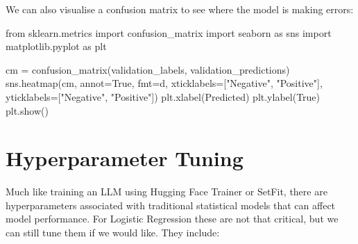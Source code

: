 \documentclass[
  letterpaper,
  DIV=11,
  numbers=noendperiod]{scrreprt}
\newenvironment{Shaded}{\begin{snugshade}}{\end{snugshade}}
\newcommand{\ImportTok}[1]{\textcolor[rgb]{0.00,0.46,0.62}{#1}}
\newcommand{\NormalTok}[1]{\textcolor[rgb]{0.00,0.23,0.31}{#1}}
\newcommand{\OperatorTok}[1]{\textcolor[rgb]{0.37,0.37,0.37}{#1}}
\newcommand{\StringTok}[1]{\textcolor[rgb]{0.13,0.47,0.30}{#1}}
\newcommand{\VariableTok}[1]{\textcolor[rgb]{0.07,0.07,0.07}{#1}}
\begin{document}
We can also visualise a confusion matrix to see where the model is
making errors:

\begin{Shaded}
\begin{Highlighting}[]
\ImportTok{from}\NormalTok{ sklearn.metrics }\ImportTok{import}\NormalTok{ confusion\_matrix}
\ImportTok{import}\NormalTok{ seaborn }\ImportTok{as}\NormalTok{ sns}
\ImportTok{import}\NormalTok{ matplotlib.pyplot }\ImportTok{as}\NormalTok{ plt}

\NormalTok{cm }\OperatorTok{=}\NormalTok{ confusion\_matrix(validation\_labels, validation\_predictions)}
\NormalTok{sns.heatmap(cm, annot}\OperatorTok{=}\VariableTok{True}\NormalTok{, fmt}\OperatorTok{=}\StringTok{\textquotesingle{}d\textquotesingle{}}\NormalTok{, xticklabels}\OperatorTok{=}\NormalTok{[}\StringTok{"Negative"}\NormalTok{, }\StringTok{"Positive"}\NormalTok{], yticklabels}\OperatorTok{=}\NormalTok{[}\StringTok{"Negative"}\NormalTok{, }\StringTok{"Positive"}\NormalTok{])}
\NormalTok{plt.xlabel(}\StringTok{\textquotesingle{}Predicted\textquotesingle{}}\NormalTok{)}
\NormalTok{plt.ylabel(}\StringTok{\textquotesingle{}True\textquotesingle{}}\NormalTok{)}
\NormalTok{plt.show()}
\end{Highlighting}
\end{Shaded}

\section{Hyperparameter Tuning}\label{hyperparameter-tuning}

Much like training an LLM using Hugging Face Trainer or SetFit, there
are hyperparameters associated with traditional statistical models that
can affect model performance. For Logistic Regression these are not that
critical, but we can still tune them if we would like. They include:
\end{document}
